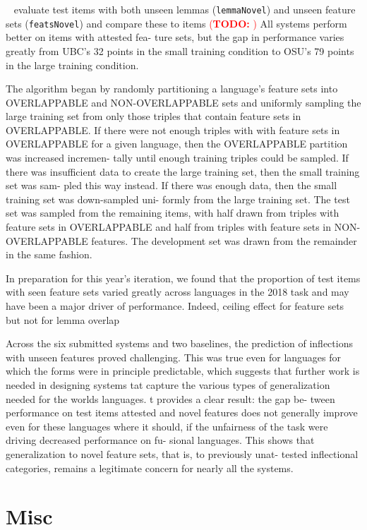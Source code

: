 \documentclass[11pt]{article}
\newcommand{\todo}[1]{\textcolor{red}{(\textbf{TODO:} #1)}}
\newcommand{\kodnera}{\citeauthor{kodner-etal-2022-sigmorphon}}
\begin{document}
\kodnera~ evaluate test items with both unseen lemmas (\texttt{lemmaNovel}) and unseen feature sets (\texttt{featsNovel}) and compare these to items \todo{}
All systems perform better on items with attested fea- ture sets, but the gap in performance varies greatly from UBC’s 32 points in the small training condition to OSU’s 79 points in the large training condition.

The algorithm began by randomly partitioning a language’s feature sets into OVERLAPPABLE and NON-OVERLAPPABLE sets and uniformly sampling the large training set from only those triples that contain feature sets in OVERLAPPABLE. If there were not enough triples with with feature sets in OVERLAPPABLE for a given language, then the OVERLAPPABLE partition was increased incremen- tally until enough training triples could be sampled. If there was insufficient data to create the large training set, then the small training set was sam- pled this way instead. If there was enough data, then the small training set was down-sampled uni- formly from the large training set.
The test set was sampled from the remaining items, with half drawn from triples with feature sets in OVERLAPPABLE and half from triples with feature sets in NON-OVERLAPPABLE features. The development set was drawn from the remainder in the same fashion.


In preparation for this year’s iteration, we found that the proportion of test items with seen feature sets varied greatly across languages in the 2018 task and may have been a major driver of performance. 
Indeed, ceiling effect for feature sets but not for lemma overlap 




Across the six submitted systems and two baselines, the prediction of inflections with unseen features proved challenging. 
This was true even for languages for which the forms were in principle predictable, which suggests that further work is needed in designing systems tat capture the various types of generalization needed for the worlds languages. 
t provides a clear result: the gap be- tween performance on test items attested and novel features does not generally improve even for these languages where it should, if the unfairness of the task were driving decreased performance on fu- sional languages. This shows that generalization to novel feature sets, that is, to previously unat- tested inflectional categories, remains a legitimate concern for nearly all the systems.


\section{Misc}
\end{document}
